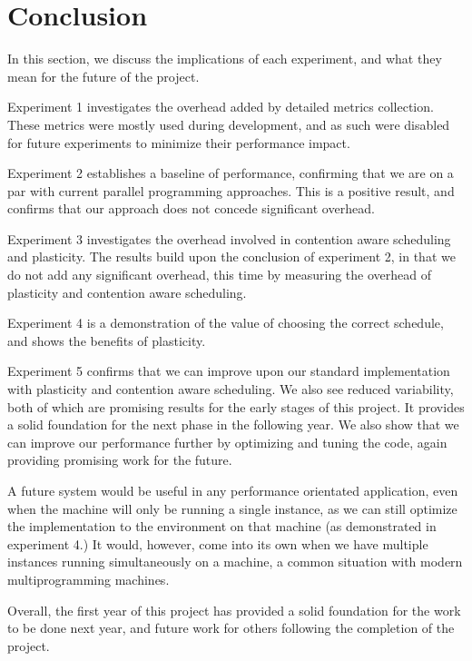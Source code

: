 



\section{Conclusion}

In this section, we discuss the implications of each experiment, and what they mean for the future of the project. 

Experiment 1 investigates the overhead added by detailed metrics collection. These metrics were mostly used during development, and as such were disabled for future experiments to minimize their performance impact. 

Experiment 2 establishes a baseline of performance, confirming that we are on a par with current parallel programming approaches. This is a positive result, and confirms that our approach does not concede significant overhead. 

Experiment 3 investigates the overhead involved in contention aware scheduling and plasticity. The results build upon the conclusion of experiment 2, in that we do not add any significant overhead, this time by measuring the overhead of plasticity and contention aware scheduling.

Experiment 4 is a demonstration of the value of choosing the correct schedule, and shows the benefits of plasticity. 

Experiment 5 confirms that we can improve upon our standard implementation with plasticity and contention aware scheduling. We also see reduced variability, both of which are promising results for the early stages of this project. It provides a solid foundation for the next phase in the following year. We also show that we can improve our performance further by optimizing and tuning the code, again providing promising work for the future.

A future system would be useful in any performance orientated application, even when the machine will only be running a single instance, as we can still optimize the implementation to the environment on that machine (as demonstrated in experiment 4.) It would, however, come into its own when we have multiple instances running simultaneously on a machine, a common situation with modern multiprogramming machines.

Overall, the first year of this project has provided a solid foundation for the work to be done next year, and future work for others following the completion of the project.